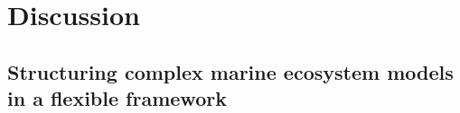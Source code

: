 \documentclass[journal abbreviation, manuscript]{copernicus}
\begin{document}
\section{Discussion}

\subsection{Structuring complex marine ecosystem models in a flexible framework}
\end{document}
